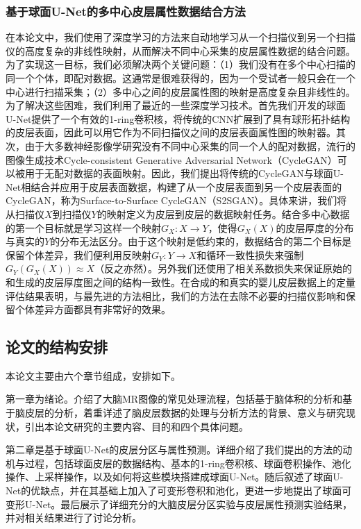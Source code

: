 \subsubsection{基于球面U-Net的多中心皮层属性数据结合方法}
在本论文中，我们使用了深度学习的方法来自动地学习从一个扫描仪到另一个扫描仪的高度复杂的非线性映射，从而解决不同中心采集的皮层属性数据的结合问题。为了实现这一目标，我们必须解决两个关键问题：（1）我们没有在多个中心扫描的同一个个体，即配对数据。这通常是很难获得的，因为一个受试者一般只会在一个中心进行扫描采集；（2）多中心之间的皮层属性图的映射是高度复杂且非线性的。为了解决这些困难，我们利用了最近的一些深度学习技术\cite{zhu2017unpaired,zhao2019spherical_ipmi}。首先我们开发的球面U-Net提供了一个有效的1-ring卷积核，将传统的CNN扩展到了具有球形拓扑结构的皮层表面，因此可以用它作为不同扫描仪之间的皮层表面属性图的映射器。其次，由于大多数神经影像学研究没有不同中心采集的同一个人的配对数据，流行的图像生成技术Cycle-consistent Generative Adversarial Network（CycleGAN）\cite{zhu2017unpaired}可以被用于无配对数据的表面映射。因此，我们提出将传统的CycleGAN与球面U-Net相结合并应用于皮层表面数据，构建了从一个皮层表面到另一个皮层表面的CycleGAN，称为Surface-to-Surface CycleGAN（S2SGAN）。具体来讲，我们将从扫描仪$X$到扫描仪$Y$的映射定义为皮层到皮层的数据映射任务。结合多中心数据的第一个目标就是学习这样一个映射$G_X: X\rightarrow Y$，使得$G_X(X)$的皮层厚度的分布与真实的$Y$的分布无法区分。由于这个映射是低约束的，数据结合的第二个目标是保留个体差异，我们便利用反映射$G_Y: Y\rightarrow X$和循环一致性损失来强制$G_Y(G_X(X))\approx X$（反之亦然）。另外我们还使用了相关系数损失来保证原始的和生成的皮层厚度图之间的结构一致性。在合成的和真实的婴儿皮层数据上的定量评估结果表明，与最先进的方法相比，我们的方法在去除不必要的扫描仪影响和保留个体差异方面都具有非常好的效果。


\subsection{论文的结构安排}
本论文主要由六个章节组成，安排如下。

第一章为绪论。介绍了大脑MR图像的常见处理流程，包括基于脑体积的分析和基于脑皮层的分析，着重详述了脑皮层数据的处理与分析方法的背景、意义与研究现状，引出本论文研究的主要内容、目的和四个具体问题。

第二章是基于球面U-Net的皮层分区与属性预测。详细介绍了我们提出的方法的动机与过程，包括球面皮层的数据结构、基本的1-ring卷积核、球面卷积操作、池化操作、上采样操作，以及如何将这些模块搭建成球面U-Net。随后叙述了球面U-Net的优缺点，并在其基础上加入了可变形卷积和池化，更进一步地提出了球面可变形U-Net。最后展示了详细充分的大脑皮层分区实验与皮层属性预测实验结果，并对相关结果进行了讨论分析。

